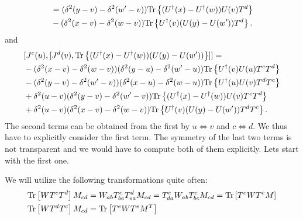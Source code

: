 \documentclass[10pt]{article}
\numberwithin{equation}{section}
\begin{document}
\begin{align}
    [J^d(v), {\rm Tr}  \left\{ (U^\dagger(x) - U^\dagger(w)) (U(y) - U(w')) \right\} ]
    & = (\delta^2(y-v) - \delta^2(w'-v)) {\rm Tr} \left\{  (U^\dagger(x) - U^\dagger(w)) U(v) T^d  \right\} \notag \\ &- (\delta^2(x-v) - \delta^2(w-v)) {\rm Tr} \left\{ U^\dagger(v)  (U(y) - U(w')) T^d  \right\} . 
\end{align}
and 
\begin{align}
    &[J^c(u) , [J^d(v), {\rm Tr}  \left\{ (U^\dagger(x) - U^\dagger(w)) (U(y) - U(w')) \right\} ]] 
     = \notag \\  
    & - (\delta^2(x-v) - \delta^2(w-v))  (\delta^2(y-u) - \delta^2(w'-u)) {\rm Tr} \left\{ U^\dagger(v)  U(u) T^c T^d  \right\}  
    \notag \\ 
    & - (\delta^2(y-v) - \delta^2(w'-v))  (\delta^2(x-u) - \delta^2(w-u)) {\rm Tr} \left\{  U^\dagger(u) U(v) T^d T^c  \right\} 
    \notag \\ 
    & + \delta^2(u-v) (\delta^2(y-v) - \delta^2(w'-v))  {\rm Tr} \left\{  (U^\dagger(x)  - U^\dagger(w) )U(v) T^c T^d  \right\} 
    \notag \\ 
    & + \delta^2(u-v) (\delta^2(x-v) - \delta^2(w-v))  {\rm Tr} \left\{  U^\dagger(v) (U(y)-U(w')) T^d T^c  \right\} . 
\end{align}
The second terms can be obtained from the first by $u \Leftrightarrow v $ and $c  \Leftrightarrow d$. We thus have to explicitly consider the first term. The symmetry of the last two terms is not transparent and we would have to compute both of them explicitly. Lets start with the first one.    

We will utilize the following transformations quite often: 
\begin{align}
    &{\rm Tr} \left [ W T^c T^d \right] M_{cd} = W_{ab} T^c_{be} T^{d}_{ea} M_{cd} = T^{e}_{da} W_{ab} T^{e}_{bc} M_{cd} = {\rm Tr} \left[ T^e W T^e M \right] \\ 
    &
    {\rm Tr} \left [ W T^d T^c \right] M_{cd} =  {\rm Tr} \left[ T^e W T^e M^T \right]
\end{align}
\end{document}
